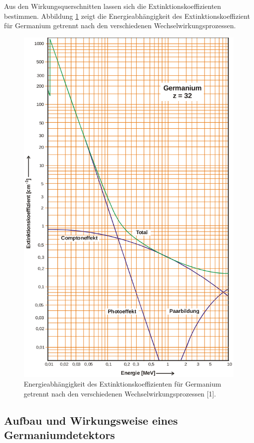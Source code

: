 Aus den Wirkungsquerschnitten lassen sich die Extinktionskoeffizienten bestimmen. Abbildung \ref{fig:Ext} zeigt die Energieabhängigkeit des Extinktionskoeffizient
für Germanium getrennt nach den verschiedenen Wechselwirkungsprozessen.

\begin{figure}
    \centering
    \includegraphics[scale=0.5]{content/Ext.png}
    \caption{Energieabhängigkeit des Extinktionskoeffizienten für Germanium getrennt nach den verschiedenen Wechselwirkungsprozessen [1].}
    \label{fig:Ext}
\end{figure}

\subsection{Aufbau und Wirkungsweise eines Germaniumdetektors}

